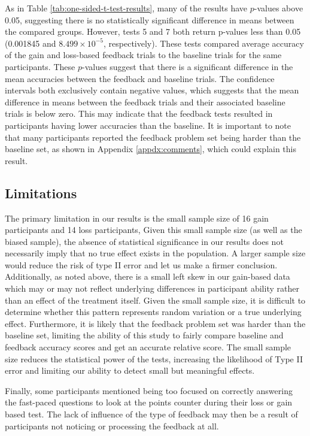 \documentclass[12pt]{exam}
\begin{document}
As in Table \ref{tab:one-sided-t-test-results}, many of the results have $p$-values above 0.05, suggesting there is no statistically significant difference in means between the compared groups. However, tests 5 and 7 both return p-values less than 0.05 (0.001845 and $8.499\times10^{-5}$, respectively). These tests compared average accuracy of the gain and loss-based feedback trials to the baseline trials for the same participants. These $p$-values suggest that there is a significant difference in the mean accuracies between the feedback and baseline trials. The confidence intervals both exclusively contain negative values, which suggests that the mean difference in means between the feedback trials and their associated baseline trials is below zero. This may indicate that the feedback tests resulted in participants having lower accuracies than the baseline. It is important to note that many participants reported the feedback problem set being harder than the baseline set, as shown in Appendix \ref{appdx:comments}, which could explain this result.

\subsection{Limitations}

The primary limitation in our results is the small sample size of 16 gain participants and 14 loss participants, Given this small sample size (as well as the biased sample), the absence of statistical significance in our results does not necessarily imply that no true effect exists in the population. A larger sample size would reduce the risk of type II error and let us make a firmer conclusion.
Additionally, as noted above, there is a small left skew in our gain-based data which may or may not reflect underlying differences in participant ability rather than an effect of the treatment itself. Given the small sample size, it is difficult to determine whether this pattern represents random variation or a true underlying effect. Furthermore, it is likely that the feedback problem set was harder than the baseline set, limiting the ability of this study to fairly compare baseline and feedback accuracy scores and get an accurate relative score. The small sample size reduces the statistical power of the tests, increasing the likelihood of Type II error and limiting our ability to detect small but meaningful effects.

Finally, some participants mentioned being too focused on correctly answering the fast-paced questions to look at the points counter during their loss or gain based test. The lack of influence of the type of feedback may then be a result of participants not noticing or processing the feedback at all. 
\end{document}
